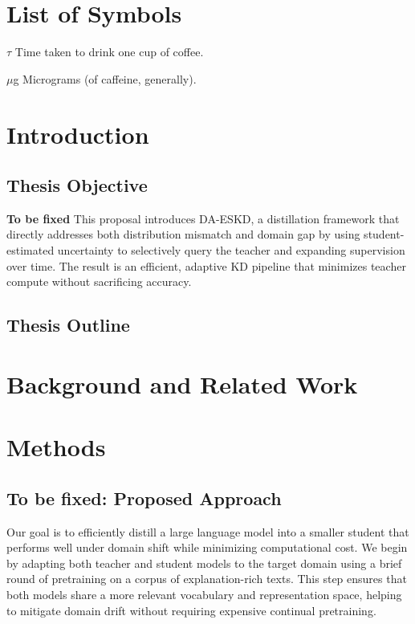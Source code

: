 \documentclass[draft]{uiucthesis2021}
\begin{document}
\chapter{List of Symbols}

\begin{symbollist}[0.7in]
\item[$\tau$] Time taken to drink one cup of coffee.
\item[$\mu$g] Micrograms (of caffeine, generally).
\end{symbollist}

\mainmatter

\chapter{Introduction}



\section{Thesis Objective}

\textbf{To be fixed}
This proposal introduces DA-ESKD, a distillation framework that directly addresses both distribution mismatch and domain gap by using student-estimated uncertainty to selectively query the teacher and expanding supervision over time. 
The result is an efficient, adaptive KD pipeline that minimizes teacher compute without sacrificing accuracy.

\section{Thesis Outline}

\chapter{Background and Related Work}





\chapter{Methods}
\section{To be fixed: Proposed Approach}
Our goal is to efficiently distill a large language model into a smaller student that performs well under domain shift while minimizing computational cost. We begin by adapting both teacher and student models to the target domain using a brief round of pretraining on a corpus of explanation-rich texts. This step ensures that both models share a more relevant vocabulary and representation space, helping to mitigate domain drift without requiring expensive continual pretraining.
\end{document}
